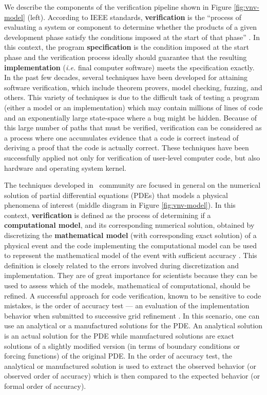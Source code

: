 We describe the components of the verification pipeline shown in Figure
\ref{fig:vnv-model} (left).
According to IEEE standards, \textbf{verification} is the ``process of
evaluating a 
system or component to determine whether the products of a given 
development phase satisfy the conditions imposed at the start of
that phase'' \cite{159342}.
%
In this context, the program \textbf{specification} is the condition
imposed at the start phase and the verification process
ideally should guarantee that the resulting \textbf{implementation}
({\em i.e.} final computer software) meets the 
specification exactly. 
%
In the past
few decades, several techniques have been developed
for attaining software verification, which include theorem
provers\cite{Bowen95}, 
model checking\cite{Clarke08},
fuzzing\cite{bird83, godefroid08},  and others. This variety of
techniques is due to the difficult task of testing a program (either
a model or an implementation) which may contain millions of lines
of code and an exponentially large state-space where a
bug might be 
hidden. Because of this large number of paths that must be verified,
verification can be considered as a
process where one accumulates evidence that a code is
correct\cite{roach98} instead of deriving a proof that the code is actually correct.
These techniques have been successfully applied not only for
verification of 
user-level computer code\cite{1646374}, but also
hardware\cite{seger92} and  
operating system kernel\cite{1629596}. 


The techniques developed in \cse~community are focused in general on the
numerical solution of partial differential equations (PDEs) that 
models a physical phenomena of
interest (middle diagram in Figure \ref{fig:vnv-model}). In this context, 
\textbf{verification} is defined as the process of determining if a
\textbf{computational model}, and its corresponding numerical solution, 
obtained by discretizing the \textbf{mathematical model} (with corresponding
exact solution) of a physical event and the code
implementing the computational model  
can be used to represent the mathematical model of the event with 
sufficient accuracy \cite{babuska04}.
%
This definition is closely related to the errors involved during
discretization and implementation. They are of great importance for
scientists because they can be used to assess which of the models,
mathematical of computational, should be refined.  A successful
approach for code verification, known to be sensitive to code
mistakes\cite{roach98}, is the order of accuracy test --- an
evaluation of the implementation behavior when submitted to successive
grid refinement \cite{roach98}. In this scenario, one can use an
analytical or a manufactured solutions for the PDE. An analytical
solution is an actual solution for the PDE while manufactured
solutions are exact solutions of a slightly modified version (in terms
of boundary conditions or forcing functions) of the original PDE. In
the order of accuracy test, the analytical or manufactured solution is
used to extract the observed behavior (or observed order of accuracy)
which is then compared to the expected behavior (or formal order of
accuracy).



